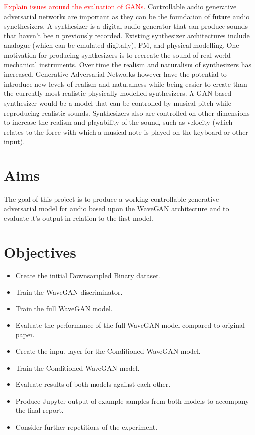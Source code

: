 \documentclass[a4paper, titlepage]{article}
\begin{document}
\newline
\newline
\textcolor{red}{
  Explain issues around the evaluation of GANs.
}
\newline
\newline
Controllable audio generative adversarial networks are important as they can be the foundation of future audio synethesizers.
A synthesizer is a digital audio generator that can produce sounds that haven't bee n previously recorded.
Existing synthesizer architectures include analogue (which can be emulated digitally), FM, and physical modelling.
One motivation for producing synthesizers is to recreate the sound of real world mechanical instruments.
Over time the realism and naturalism of synthesizers has increased.
Generative Adversarial Networks however have the potential to introduce new levels of realism and naturalness while being easier to create than the currently most-realistic physically modelled synthesizers.
\newline
\newline
A GAN-based synthesizer would be a model that can be controlled by musical pitch while reproducing realistic sounds.
Synthesizers also are controlled on other dimensions to increase the realism and playability of the sound, such as velocity (which relates to the force with which a musical note is played on the keyboard or other input).

\section{Aims}

The goal of this project is to produce a working controllable generative adversarial model for audio based upon the WaveGAN architecture and to evaluate it's output in relation to the first model.

\section{Objectives}

\begin{itemize}
\item Create the initial Downsampled Binary dataset.
\item Train the WaveGAN discriminator.
\item Train the full WaveGAN model.
\item Evaluate the performance of the full WaveGAN model compared to original paper.
\item Create the input layer for the Conditioned WaveGAN model.
\item Train the Conditioned WaveGAN model.
\item Evaluate results of both models against each other.
\item Produce Jupyter output of example samples from both models to accompany the final report.
\item Consider further repetitions of the experiment.
\end{itemize}
\end{document}
